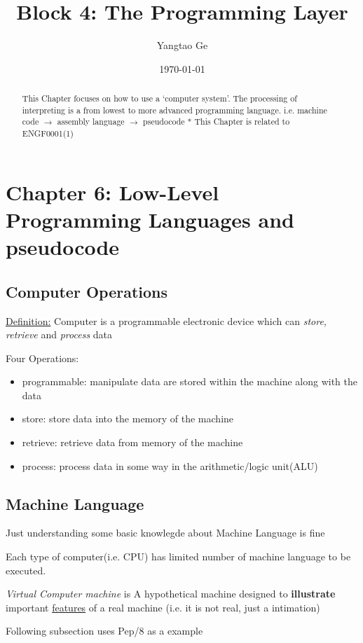 \documentclass[12pt]{article}
\title{Block 4: The Programming Layer}
\author{Yangtao Ge}
\date{\today}
\begin{document}
\maketitle

\section{Chapter 6: Low-Level Programming Languages and pseudocode}
\begin{abstract}
    This Chapter focuses on how to use a `computer system'. The processing of interpreting is a from
    lowest to more advanced programming language.\newline
    i.e. machine code $\rightarrow$ assembly language $\rightarrow$ pseudocode\newline
    * This Chapter is related to ENGF0001(1) 
\end{abstract}

\subsection{Computer Operations}
\underline{Definition:} Computer is a programmable electronic device which can \textit{store, retrieve} and \textit{process} data

Four Operations:
\begin{itemize}
    \item programmable: manipulate data are stored within the machine along with the data
    \item store: store data into the memory of the machine
    \item retrieve: retrieve data from memory of the machine
    \item process: process data in some way in the arithmetic/logic unit(ALU)
\end{itemize}

\subsection{Machine Language}
Just understanding some basic knowlegde about Machine Language is fine

Each type of computer(i.e. CPU) has limited number of machine language to be executed.

\emph{Virtual Computer machine} is A hypothetical machine designed to \textbf{illustrate} important \underline{features} of a real machine
(i.e. it is not real, just a intimation)

Following subsection uses Pep/8 as a example
\end{document}
